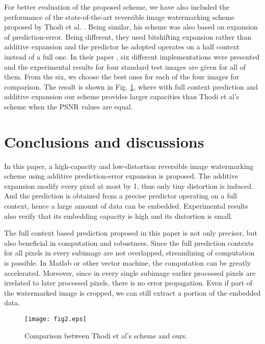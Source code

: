 \documentclass{article}
\begin{document}
For better evaluation of the proposed scheme, we have also included the performance of the
state-of-the-art reversible image watermarking scheme proposed by Thodi et al. \cite{Thodi07pee}.
Being similar, his scheme was also based on expansion of prediction-error. Being different, they
used bitshifting expansion rather than additive expansion and the predictor he adopted operates on a
half context instead of a full one. In their paper \cite{Thodi07pee}, six different implementations
were presented and the experimental results for four standard test images are given for all of them.
From the six, we choose the best ones for each of the four images for comparison. The result is
shown in Fig. \ref{fig:compare}, where with full context prediction and additive expansion our
scheme provides larger capacities than Thodi et al's scheme when the PSNR values are equal.

\section{Conclusions and discussions} \label{sec:conclusion}
In this paper, a high-capacity and low-distortion reversible image watermarking scheme using
additive prediction-error expansion is proposed. The additive expansion modify every pixel at most
by 1, thus only tiny distortion is induced. And the prediction is obtained from a precise predictor
operating on a full context, hence a large amount of data can be embedded. Experimental results also
verify that its embedding capacity is high and its distortion is small. 

The full context based prediction proposed in this paper is not only preciser, but also beneficial
in computation and robustness. Since the full prediction contexts for all pixels in every subimage
are not overlapped, streamlining of computation is possible. In Matlab or other vector machine, the
computation can be greatly accelerated. Moreover, since in every single subimage earlier processed
pixels are irrelated to later processed pixels, there is no error propagation. Even if part of the
watermarked image is cropped, we can still extract a portion of the embedded data.

\begin{figure}[t]
  \texttt{[image: fig2.eps]}
  \caption{\label{fig:compare}Comparison between Thodi et al's scheme and ours.}
\end{figure}



\end{document}
